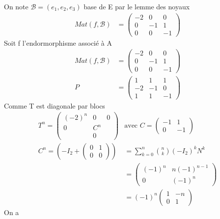 \documentclass{article}
\begin{document}
On note \(\mathcal{B} = (e_1, e_2, e_3)\) base de E par le lemme des noyaux \\
\begin{align*}
  Mat(f,\mathcal{B}) &= \begin{pmatrix}
    -2 & 0 & 0\\ 0 & -1 & 1 \\ 0 & 0 & -1
  \end{pmatrix} 
\end{align*}
Soit f l'endormorphisme associé à A 
\begin{align*}
  Mat(f, \mathcal{B}) &= \begin{pmatrix}
      -2 & 0 & 0 \\
      0 & -1 & 1\\
      0 & 0 & -1
    \end{pmatrix}\\
    P &= \begin{pmatrix}
      1 & 1 & 1 \\ -2 & -1 & 0 \\ 1 & 1 & -1
    \end{pmatrix}
\end{align*}
Comme T est diagonale par blocs 
\begin{align*}
    T^n = \begin{pmatrix}
      (-2)^{n} & 0 & 0 \\ 0 & C^n & \\ & 0 & 
    \end{pmatrix} &\text{avec } C = \begin{pmatrix}
    -1 & 1 \\ 0 & -1
    \end{pmatrix}\\
    C^n = (-I_2+ \begin{pmatrix}
      0 & 1 \\ 0 & 0
    \end{pmatrix}
    )
    &= \sum_{k=0}^{n} \binom{n}{k} (-I_2)^{k}N^k\\
    &= \begin{pmatrix}
      (-1)^{n} & n(-1)^{n-1}\\
      0 & (-1)^{n}
    \end{pmatrix}\\
    &= (-1)^{n}\begin{pmatrix}
      1 & -n \\ 0 & 1
    \end{pmatrix} 
\end{align*}
On a 
\end{document}
